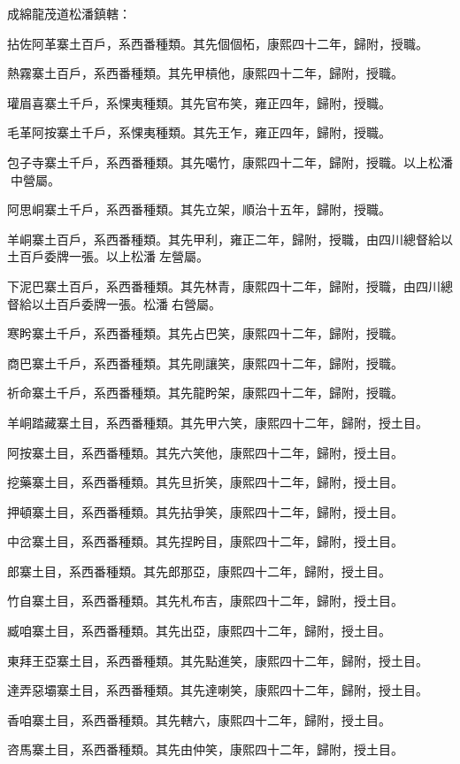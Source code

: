 \begin{pinyinscope}
成綿龍茂道松潘鎮轄：

拈佐阿革寨土百戶，系西番種類。其先個個柘，康熙四十二年，歸附，授職。

熱霧寨土百戶，系西番種類。其先甲槓他，康熙四十二年，歸附，授職。

瓘眉喜寨土千戶，系惈夷種類。其先官布笑，雍正四年，歸附，授職。

毛革阿按寨土千戶，系惈夷種類。其先王乍，雍正四年，歸附，授職。

包子寺寨土千戶，系西番種類。其先噶竹，康熙四十二年，歸附，授職。以上松潘中營屬。

阿思峒寨土千戶，系西番種類。其先立架，順治十五年，歸附，授職。

羊峒寨土百戶，系西番種類。其先甲利，雍正二年，歸附，授職，由四川總督給以土百戶委牌一張。以上松潘左營屬。

下泥巴寨土百戶，系西番種類。其先林青，康熙四十二年，歸附，授職，由四川總督給以土百戶委牌一張。松潘右營屬。

寒盻寨土千戶，系西番種類。其先占巴笑，康熙四十二年，歸附，授職。

商巴寨土千戶，系西番種類。其先剛讓笑，康熙四十二年，歸附，授職。

祈命寨土千戶，系西番種類。其先龍盻架，康熙四十二年，歸附，授職。

羊峒踏藏寨土目，系西番種類。其先甲六笑，康熙四十二年，歸附，授土目。

阿按寨土目，系西番種類。其先六笑他，康熙四十二年，歸附，授土目。

挖藥寨土目，系西番種類。其先旦折笑，康熙四十二年，歸附，授土目。

押頓寨土目，系西番種類。其先拈爭笑，康熙四十二年，歸附，授土目。

中岔寨土目，系西番種類。其先捏盻目，康熙四十二年，歸附，授土目。

郎寨土目，系西番種類。其先郎那亞，康熙四十二年，歸附，授土目。

竹自寨土目，系西番種類。其先札布吉，康熙四十二年，歸附，授土目。

臧咱寨土目，系西番種類。其先出亞，康熙四十二年，歸附，授土目。

東拜王亞寨土目，系西番種類。其先點進笑，康熙四十二年，歸附，授土目。

達弄惡壩寨土目，系西番種類。其先達喇笑，康熙四十二年，歸附，授土目。

香咱寨土目，系西番種類。其先轄六，康熙四十二年，歸附，授土目。

咨馬寨土目，系西番種類。其先由仲笑，康熙四十二年，歸附，授土目。


\end{pinyinscope}
